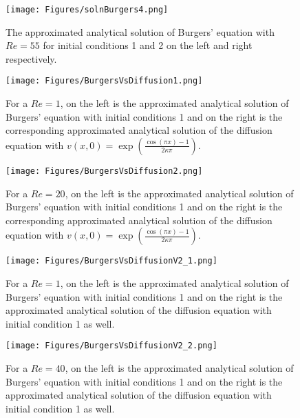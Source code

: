 \documentclass[undefended]{sfuthesis}
\begin{document}
\begin{figure}[h!]
	\centering
	\texttt{[image: Figures/solnBurgers4.png]}
	\caption{The approximated analytical solution of Burgers' equation with $Re = 55$ for initial conditions 1 and 2 on the left and right respectively.}
	\label{fig:solnBurgers4}
\end{figure}

\begin{figure}[h!]
	\centering
	\texttt{[image: Figures/BurgersVsDiffusion1.png]}
	\caption{For a $Re = 1$, on the left is the approximated analytical solution of Burgers' equation with initial conditions 1 and on the right is the corresponding approximated analytical solution of the diffusion equation with $v(x, 0) = \exp\left(\frac{\cos(\pi x) - 1}{2 \kappa \pi}\right)$.}
	\label{fig:BurgersVsDiffusion1}
\end{figure}

\begin{figure}[h!]
	\centering
	\texttt{[image: Figures/BurgersVsDiffusion2.png]}
	\caption{For a $Re = 20$, on the left is the approximated analytical solution of Burgers' equation with initial conditions 1 and on the right is the corresponding approximated analytical solution of the diffusion equation with $v(x, 0) = \exp\left(\frac{\cos(\pi x) - 1}{2 \kappa \pi}\right)$.}
	\label{fig:BurgersVsDiffusion2}
\end{figure}

\begin{figure}[h!]
	\centering
	\texttt{[image: Figures/BurgersVsDiffusionV2\_1.png]}
	\caption{For a $Re = 1$, on the left is the approximated analytical solution of Burgers' equation with initial conditions 1 and on the right is the approximated analytical solution of the diffusion equation with initial condition 1 as well.}
	\label{fig:BurgersVsDiffusionV2_1}
\end{figure}

\begin{figure}[h!]
	\centering
	\texttt{[image: Figures/BurgersVsDiffusionV2\_2.png]}
	\caption{For a $Re = 40$, on the left is the approximated analytical solution of Burgers' equation with initial conditions 1 and on the right is the approximated analytical solution of the diffusion equation with initial condition 1 as well.}
	\label{fig:BurgersVsDiffusionV2_2}
\end{figure}
\end{document}
